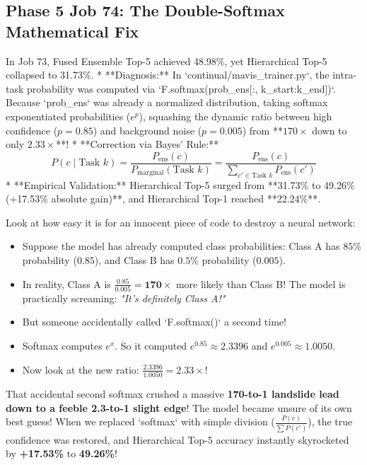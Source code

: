 \documentclass[11pt,a4paper]{article}
\begin{document}
\subsection{Phase 5 Job 74: The Double-Softmax Mathematical Fix}
In Job 73, Fused Ensemble Top-5 achieved 48.98\%, yet Hierarchical Top-5 collapsed to 31.73\%.
* **Diagnosis:** In `continual/mavis_trainer.py`, the intra-task probability was computed via `F.softmax(prob_ens[:, k_start:k_end])`. Because `prob_ens` was already a normalized distribution, taking softmax exponentiated probabilities ($e^p$), squashing the dynamic ratio between high confidence ($p=0.85$) and background noise ($p=0.005$) from **$170\times$ down to only $2.33\times$**!
* **Correction via Bayes' Rule:**
  \begin{equation}
  P(c \mid \text{Task } k) = \frac{P_{\text{ens}}(c)}{P_{\text{marginal}}(\text{Task } k)} = \frac{P_{\text{ens}}(c)}{\sum_{c' \in \text{Task } k} P_{\text{ens}}(c')}
  \end{equation}
* **Empirical Validation:** Hierarchical Top-5 surged from **31.73\% to 49.26\% (+17.53\% absolute gain)**, and Hierarchical Top-1 reached **22.24\%**.

\begin{callout}
Look at how easy it is for an innocent piece of code to destroy a neural network:
\begin{itemize}[noitemsep]
    \item Suppose the model has already computed class probabilities: Class A has $85\%$ probability ($0.85$), and Class B has $0.5\%$ probability ($0.005$).
    \item In reality, Class A is $\frac{0.85}{0.005} = \mathbf{170\times}$ more likely than Class B! The model is practically screaming: \textit{"It's definitely Class A!"}
    \item But someone accidentally called `F.softmax()` a second time!
    \item Softmax computes $e^x$. So it computed $e^{0.85} \approx 2.3396$ and $e^{0.005} \approx 1.0050$.
    \item Now look at the new ratio: $\frac{2.3396}{1.0050} = \mathbf{2.33\times}$!
\end{itemize}
That accidental second softmax crushed a massive \textbf{170-to-1 landslide lead down to a feeble 2.3-to-1 slight edge}! The model became unsure of its own best guess! When we replaced `softmax` with simple division ($\frac{P(c)}{\sum P(c')}$), the true confidence was restored, and Hierarchical Top-5 accuracy instantly skyrocketed by \textbf{+17.53\%} to \textbf{49.26\%}!
\end{callout}
\end{document}
